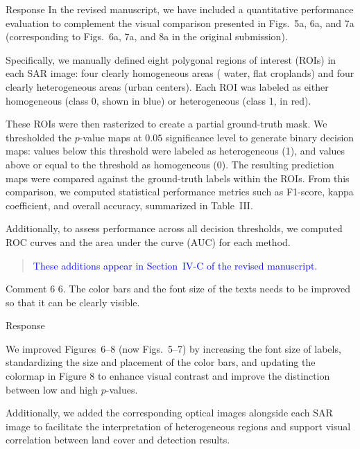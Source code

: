 \documentclass[11pt]{report}
\begin{document}
\begin{responsebox}{Response}
In the revised manuscript, we have included a quantitative performance evaluation to complement the visual comparison presented in Figs.~5a, 6a, and 7a (corresponding to Figs.~6a, 7a, and 8a in the original submission).

Specifically, we manually defined eight polygonal regions of interest (ROIs) in each SAR image: four clearly homogeneous areas ( water, flat croplands) and four clearly heterogeneous areas (urban centers). Each ROI was labeled as either homogeneous (class 0, shown in blue) or heterogeneous (class 1, in red).

These ROIs were then rasterized to create a partial ground-truth mask. 
We thresholded the $p$-value maps at $0.05$ significance level to generate binary decision maps: values below this threshold were labeled as heterogeneous (1), and values above or equal to the threshold as homogeneous (0). 
The resulting prediction maps were compared against the ground-truth labels within the ROIs. 
From this comparison, we computed statistical performance metrics such as F1-score, kappa coefficient, and overall accuracy, summarized in Table~III.

Additionally, to assess performance across all decision thresholds, we computed ROC curves and the area under the curve (AUC) for each method.

\begin{quote}
\textcolor{blue}{These additions appear in Section~IV-C of the revised manuscript.
}
\end{quote}
\end{responsebox}


\vspace{9em}
\begin{reviewbox}{Comment 6}
6. The color bars and the font size of the texts needs to be improved so that it can be clearly visible.
\end{reviewbox}
\begin{responsebox}{Response}


We improved Figures~6–8 (now Figs.~5–7)  by increasing the font size of labels, standardizing the size and placement of the color bars, and updating the colormap in Figure 8 to enhance visual contrast and improve the distinction between low and high $p$-values.

Additionally, we added the corresponding optical images alongside each SAR image to facilitate the interpretation of heterogeneous regions and support visual correlation between land cover and detection results.

\end{responsebox}
\end{document}
